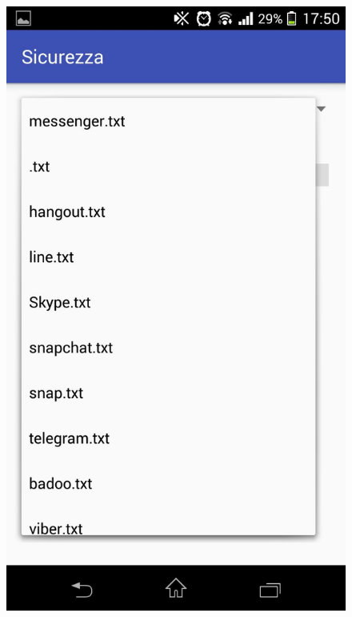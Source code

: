 \documentclass[12pt]{article} %
\begin{document}
\begin{figure}[htbp]
{\includegraphics[scale=0.2]{./filelist.jpeg}}\qquad\qquad
{}%

\end{figure}
\end{document}
